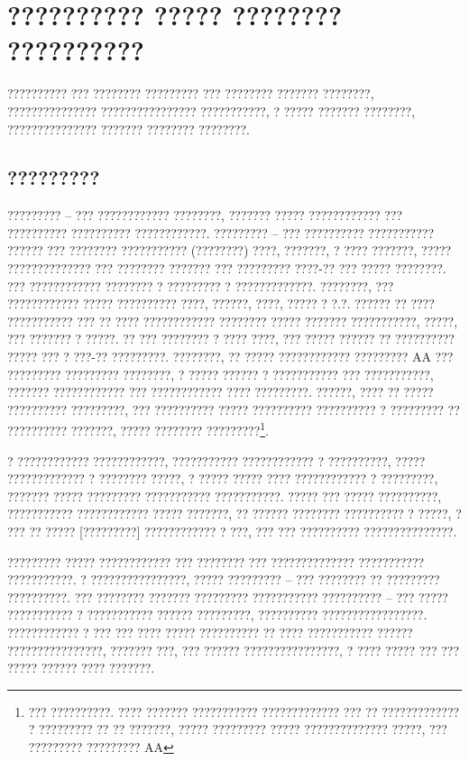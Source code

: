 \section{?????????? ????? ???????? ??????????}

?????????? ??? ???????? ????????? ??? ???????? ??????? ????????, ??????????????? ???????????????? ???????????, ? ????? ??????? ????????, ??????????????? ??????? ???????? ????????.

\subsection{?????????}

????????? -- ??? ???????????? ????????, ??????? ????? ???????????? ??? ?????????? ?????????? ????????????. ????????? -- ??? ?????????? ??????????? ?????? ??? ???????? ??????????? (????????) ????, ???????, ? ???? ???????, ????? ?????????????? ??? ???????? ??????? ??? ????????? ????-?? ??? ????? ????????.  ??? ???????????? ???????? ? ????????? ? ?????????????.  ????????, ??? ???????????? ????? ?????????? ????, ??????, ????, ????? ? ?.?.  ?????? ?? ???? ??????????? ??? ?? ???? ???????????? ???????? ????? ??????? ???????????, ?????, ??? ??????? ? ?????.  ?? ??? ???????? ? ???? ????, ??? ????? ?????? ?? ?????????? ????? ??? ? ???-?? ?????????. ????????, ?? ????? ???????????? ????????? AA ??? ????????? ????????? ????????, ? ????? ?????? ? ??????????? ??? ???????????, ??????? ???????????? ??? ???????????? ???? ?????????.  ??????, ???? ?? ????? ?????????? ?????????, ??? ?????????? ????? ?????????? ?????????? ? ????????? ?? ?????????? ???????, ????? ???????? ?????????\footnote{??? ??????????.  ???? ??????? ??????????? ????????????? ??? ?? ????????????? ? ????????? ?? ?? ???????, ????? ????????? ????? ?????????????? ?????, ??? ????????? ????????? AA}.

? ???????????? ????????????, ??????????? ???????????? ? ??????????, ????? ????????????? ? ???????? ?????, ? ????? ????? ???? ???????????? ? ?????????, ??????? ????? ????????? ??????????? ???????????.  ????? ??? ????? ??????????, ??????????? ???????????? ????? ???????, ?? ?????? ???????? ?????????? ? ?????, ? ??? ?? ????? [?????????] ???????????? ? ???, ??? ??? ?????????? ???????????????.

????????? ????? ???????????? ??? ???????? ??? ?????????????? ??????????? ???????????.     ? ????????????????, ????? ????????? -- ??? ???????? ?? ????????? ??????????.  %
??? ???????? ??????? ????????? ??????????? ?????????? -- ??? ????? ??????????? ? ??????????? ?????? ?????????, ?????????? ?????????????????.  ???????????? ? ??? ??? ???? ????? ?????????? ?? ???? ??????????? ?????? ????????????????, ??????? ???, ??? ?????? ????????????????, ? ???? ????? ??? ??? ????? ?????? ???? ???????.  

